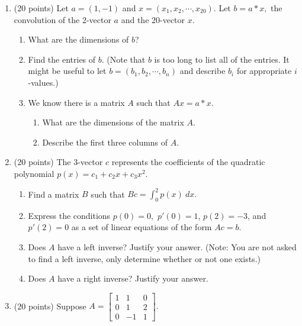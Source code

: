 \documentclass[11pt,fleqn]{article}
\begin{document}
\newpage
\begin{enumerate}

\item (20 points) Let $a=(1,-1)$ and $x=(x_1,x_2, \cdots, x_{20}).$ Let $b=a*x,$ the convolution of the 2-vector $a$ and the 20-vector $x$.
	\begin{enumerate}
	\item What are the dimensions of $b$?
	\vspace{1in}
	\item Find the entries of $b$. (Note that $b$ is too long to list all of the entries. It might be useful to let $b=(b_1,b_2, \cdots, b_n)$ and describe $b_i$ for appropriate $i$-values.)
	\vfill
	\item We know there is a matrix $A$ such that $Ax=a*x.$
		\begin{enumerate}
		\item What are the dimensions of the matrix $A$.
		\vspace{1in}
		\item Describe the first three columns of $A.$
		\vfill
		\end{enumerate}
	\end{enumerate}
\newpage
\item (20 points) The 3-vector $c$ represents the coefficients of the quadratic polynomial $p(x)=c_1+c_2x+c_3x^2.$ 
	\begin{enumerate}
	\item Find a matrix $B$ such that $Bc=\int_0^2 p(x) \: dx.$
	\vfill
	\item Express the conditions $p(0)=0,$ $p'(0)=1$, $p(2)=-3$, and $p'(2)=0$ as a set of linear equations of the form $Ac=b.$
	\vfill
	\item Does $A$ have a left inverse? Justify your answer. (Note: You are not asked to find a left inverse, only determine whether or not one exists.)
	\vspace{1in}
	\item Does $A$ have a right inverse? Justify your answer. 
	\vspace{1in}
	\end{enumerate}
\newpage
\item (20 points) Suppose $A=\begin{bmatrix}
1&1&0\\0&1&2\\0&-1&1 \end{bmatrix}.$ 
	\begin{enumerate}

\end{enumerate}
\end{enumerate}
\end{document}
